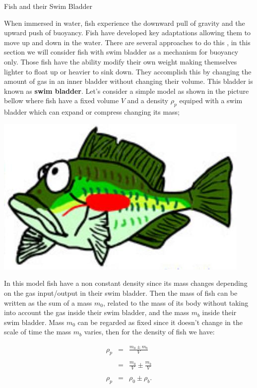 \begin{section}{Fish and their Swim Bladder}

    When immersed in water, fish experience the downward pull of gravity and the upward push of 
    buoyancy. Fish have developed key adaptations allowing them to move up and down in the water.
    There are several approaches to do this \cite{QUENTIN}, in this section we will consider fish
    with swim bladder as a mechanism for buoyancy only. Those fish have the ability modify their 
    own weight making themselves lighter to float up or heavier to sink down. They accomplish this
    by changing the amount of gas in an inner bladder without changing their volume. This bladder
    is known as \textbf{swim bladder}. Let's consider a simple model as shown in the picture 
    bellow where fish have a fixed volume $V$ and a density $\rho_p$ equiped with a swim bladder
    which can expand or compress changing its mass;
    
    \begin{center}
        \includegraphics[scale=0.35]{./pics/fish_bladder.jpg}
    \end{center}
    
    In this model fish have a non constant density since its mass changes depending on the gas
    input/output in their swim bladder. Then the mass of fish can be written as the sum of a mass 
    $m_0$, related to the mass of its body without taking into account the gas inside their swim 
    bladder, and the mass $m_b$ inside their swim bladder. Mass $m_0$ can be regarded as fixed 
    since it doesn't change in the scale of time the mass $m_b$ varies, then for the density of 
    fish we have: 
    
    \begin{eqnarray}
        \rho_p &=& \frac{m_0 \pm m_b}{V}
        \nonumber\\
        {}&{}&{} \nonumber \\
        &=& \frac{m_0}{V} \pm \frac{m_b}{V}
         \nonumber\\
        {}&{}&{} \nonumber \\
        \label{fish_density}
        \rho_p &=& \rho_0 \pm \rho_b.
    \end{eqnarray}
    

\end{section}
